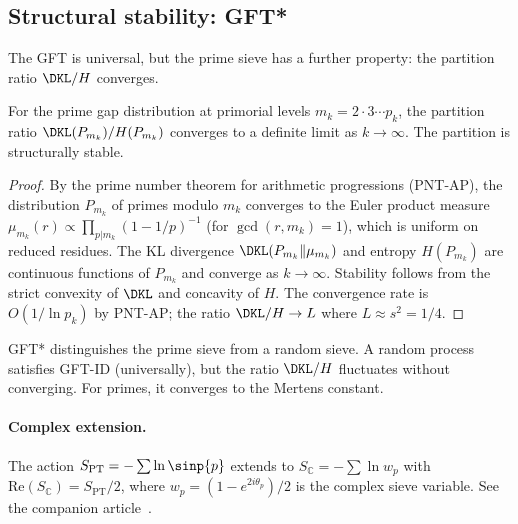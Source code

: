 \documentclass[12pt,a4paper]{article}
\begin{document}
\subsection{Structural stability: GFT*}
\label{sec:gft_star}

The GFT is universal, but the prime sieve has a further property:
the partition ratio $\DKL/H$ converges.

\mDER
\begin{theorem}
\label{thm:gft_star}
For the prime gap distribution at primorial levels $m_k = 2 \cdot 3 \cdots p_k$,
the partition ratio $\DKL(P_{m_k})/H(P_{m_k})$ converges to a definite
limit as $k \to \infty$. The partition is structurally stable.

\begin{proof}
By the prime number theorem for arithmetic progressions (PNT-AP), the
distribution $P_{m_k}$ of primes modulo $m_k$ converges to the Euler
product measure $\mu_{m_k}(r) \propto \prod_{p|m_k}(1-1/p)^{-1}$
(for $\gcd(r, m_k) = 1$), which is uniform on reduced residues.
The KL divergence $\DKL(P_{m_k}\|\mu_{m_k})$ and entropy $H(P_{m_k})$
are continuous functions of $P_{m_k}$ and converge as $k \to \infty$.
Stability follows from the strict convexity of $\DKL$ and concavity of $H$.
The convergence rate is $O(1/\ln p_k)$ by PNT-AP; the ratio
$\DKL/H \to L$ where $L \approx s^2 = 1/4$.
\end{proof}
\end{theorem}

\begin{remark}
GFT* distinguishes the prime sieve from a random sieve. A random process
satisfies GFT-ID (universally), but the ratio $\DKL/H$ fluctuates without
converging. For primes, it converges to the Mertens constant.
\end{remark}

\paragraph{Complex extension.}
The action $S_{\mathrm{PT}} = -\sum\ln\sinp{p}$ extends to
$S_{\mathbb{C}} = -\sum\ln w_p$ with $\mathrm{Re}(S_{\mathbb{C}}) = S_{\mathrm{PT}}/2$,
where $w_p = (1 - e^{2i\theta_p})/2$ is the complex sieve variable.
See the companion article~\cite{companion_M4}.

\end{document}
